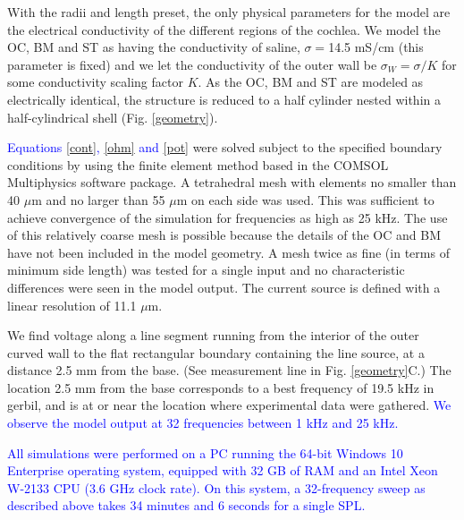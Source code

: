 \documentclass{biophys-new}
\begin{document}
\par{With the radii and length preset, the only physical parameters for the model are the electrical conductivity of the different regions of the cochlea. We model the OC, BM and ST as having the conductivity of saline, $\sigma = $14.5 mS/cm (this parameter is fixed) and we let the conductivity of the outer wall be $\sigma_W = \sigma/K$ for some conductivity scaling factor $K$. As the OC, BM and ST are modeled as electrically identical, the structure is reduced to a half cylinder nested within a half-cylindrical shell (Fig. \ref{geometry}).}
\par{\textcolor{blue}{Equations \ref{cont}, \ref{ohm} and \ref{pot}} were solved subject to the specified boundary conditions by using the finite element method based in the COMSOL Multiphysics software package. A tetrahedral mesh with elements no smaller than 40 $\mu$m and no larger than 55 $\mu$m on each side was used. This was sufficient to achieve convergence of the simulation for frequencies as high as 25 kHz. The use of this relatively coarse mesh is possible because the details of the OC and BM have not been included in the model geometry. A mesh twice as fine (in terms of minimum side length) was tested for a single input and no characteristic differences were seen in the model output. The current source is defined with a linear resolution of 11.1 $\mu$m.}
\par{We find voltage along a line segment running from the interior of the outer curved wall to the flat rectangular boundary containing the line source, at a distance 2.5 mm from the base.  (See measurement line in Fig. \ref{geometry}C.)  The location 2.5 mm from the base corresponds to a best frequency of 19.5 kHz in gerbil, and is at or near the location where experimental data were gathered. \textcolor{blue}{We observe the model output at 32 frequencies between 1 kHz and 25 kHz.}} 
\par{\textcolor{blue}{All simulations were performed on a PC running the 64-bit Windows 10 Enterprise operating system, equipped with 32 GB of RAM and an Intel Xeon W-2133 CPU (3.6 GHz clock rate). On this system, a 32-frequency sweep as described above takes 34 minutes and 6 seconds for a single SPL.}}
\end{document}
